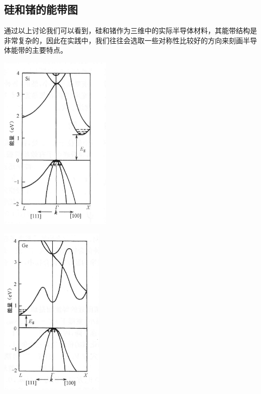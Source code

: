 \subsection{硅和锗的能带图}
通过以上讨论我们可以看到，硅和锗作为三维中的实际半导体材料，其能带结构是非常复杂的，因此在实践中，我们往往会选取一些对称性比较好的方向来刻画半导体能带的主要特点。
\begin{Figure}[硅和锗的能带图]
    \hspace{0.25em}
    \begin{FigureSub}[硅的能带图]
        \includegraphics[width=5.37cm]{image/Ge_Band.jpg}
    \end{FigureSub}
    \hspace{1.5em}
    \begin{FigureSub}[锗的能带图]
        \includegraphics[width=5cm]{image/Si_Band.jpg}
        \vspace{0.1cm}
    \end{FigureSub}
\end{Figure}

